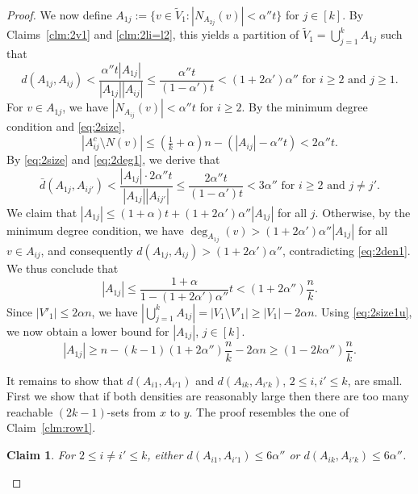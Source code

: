 \documentclass[reqno]{amsart}
\theoremstyle{plain}
\newtheorem{claim}[theorem]{Claim}
\def\a{\alpha}
\begin{document}
\begin{proof}
We now define $A_{1j}:= \{ v\in \tilde V_1: |N_{A_{2j}}(v)|<\a'' t \}$ for $ j \in [k]$. By Claims~\ref{clm:2v1} and \ref{clm:2li=l2}, this yields a partition of $\tilde V_1 = \bigcup_{j=1}^k A_{1j}$ such that
\begin{equation}\label{eq:2den1}
d(A_{1j}, A_{ij})< \frac{\a''t |A_{1j}|}{|A_{1j}||A_{ij}|} \le \frac{\a''t}{(1 - \a')t} < (1 + 2\a') \a'' \text{ for } i\ge 2 \text{ and } j\ge 1.
\end{equation}
For $v\in A_{1j}$, we have $|N_{A_{ij}}(v)| < \alpha'' t$ for $i\ge 2$. By the minimum degree condition and \eqref{eq:2size},
\begin{equation}
\label{eq:2deg1}
|A^c_{ij} \setminus N(v)| \le (\tfrac1k + \alpha)n - (|A_{ij}|- \alpha''t)< 2\a'' t.
\end{equation}
By \eqref{eq:2size} and \eqref{eq:2deg1}, we derive that
\begin{equation}\label{eq:2den1dia}
\bar d(A_{1j}, A_{ij'})<\frac {|A_{1j}| \cdot 2\a'' t }{|A_{1j}| |A_{ij'}|} \le \frac{2\a'' t}{(1-\a')t} < 3\a'' \text{ for } i\ge 2 \text{ and } j\neq j'.
\end{equation}
We claim that $|A_{1j}| \le (1+ \a)t + (1 + 2\a') \a''|A_{1j}|$ for all $j$. Otherwise, by the minimum degree condition, we have $\deg_{A_{1j}} (v)> (1 + 2\a')\a'' |A_{1j}|$ for all $v\in A_{ij}$, and consequently $d(A_{1j},A_{ij}) > (1 + 2\a') \a''$, contradicting \eqref{eq:2den1}. We thus conclude that
\begin{equation}\label {eq:2size1u}
|A_{1j}|\le \frac{1+\a}{1- (1 + 2\a')\a''} t< (1+2\a'' )\frac nk.
\end{equation}
Since $|V'_1|\le 2\a n$, we have $|\bigcup_{j=1}^{k} A_{1j}| = |V_1\setminus V'_1| \ge |V_1| - 2\a n$.
Using \eqref{eq:2size1u}, we now obtain a lower bound for $|A_{1j}|$, $j\in[k]$.
\begin{equation}\label {eq:2size1l}
|A_{1j}| \ge n - (k-1)(1+ 2 \alpha'' )\frac{n}{k} - 2 \alpha n \ge (1 - 2k\a'')\frac{n}{k}.
\end{equation}


It remains to show that $d(A_{i1},A_{i'1})$ and $d(A_{ik},A_{i'k})$, $2\le i,i'\le k$, are small.
First we show that if both densities are reasonably large then there are too many reachable $(2k-1)$-sets from $x$ to $y$. The proof resembles the one of Claim~\ref{clm:row1}.

\begin{claim} \label{clm:row1k1}
For $2\le i \ne i'\le k$, either $d(A_{i1},A_{i'1})\le 6\a''$ or $d(A_{ik},A_{i'k})\le 6\alpha''$.
\end{claim}


\end{proof}
\end{document}
